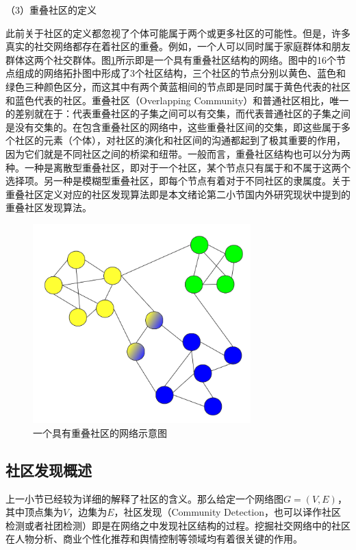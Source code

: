 （3）重叠社区的定义

此前关于社区的定义都忽视了个体可能属于两个或更多社区的可能性。但是，许多真实的社交网络都存在着社区的重叠。例如，一个人可以同时属于家庭群体和朋友群体这两个社交群体。图\ref{fig:fig2-4}所示即是一个具有重叠社区结构的网络。图中的16个节点组成的网络拓扑图中形成了3个社区结构，三个社区的节点分别以黄色、蓝色和绿色三种颜色区分，而这其中有两个黄蓝相间的节点即是同时属于黄色代表的社区和蓝色代表的社区。重叠社区（Overlapping Community）和普通社区相比，唯一的差别就在于：代表重叠社区的子集之间可以有交集，而代表普通社区的子集之间是没有交集的。在包含重叠社区的网络中，这些重叠社区间的交集，即这些属于多个社区的元素（个体），对社区的演化和社区间的沟通都起到了极其重要的作用，因为它们就是不同社区之间的桥梁和纽带。一般而言，重叠社区结构也可以分为两种。一种是离散型重叠社区，即对于一个社区，某个节点只有属于和不属于这两个选择项。另一种是模糊型重叠社区，即每个节点有着对于不同社区的隶属度。关于重叠社区定义对应的社区发现算法即是本文绪论第二小节国内外研究现状中提到的重叠社区发现算法。

\begin{figure}
  \centering
  \includegraphics[width=0.75\textwidth]{figures/fig2-4}
  \caption{一个具有重叠社区的网络示意图}\label{fig:fig2-4}
\end{figure}

\subsection{社区发现概述}
上一小节已经较为详细的解释了社区的含义。那么给定一个网络图$G=(V,E)$，其中顶点集为$V$，边集为$E$，社区发现（Community Detection，也可以译作社区检测或者社团检测）即是在网络之中发现社区结构的过程。挖掘社交网络中的社区在人物分析、商业个性化推荐和舆情控制等领域均有着很关键的作用。

